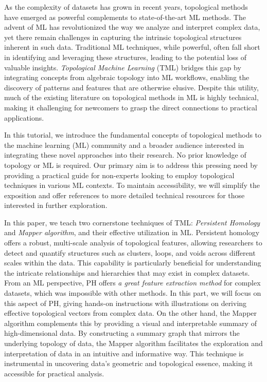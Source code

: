 


As the complexity of datasets has grown in recent years, topological methods have emerged as powerful complements to state-of-the-art ML methods. The advent of ML has revolutionized the way we analyze and interpret complex data, yet there remain challenges in capturing the intrinsic topological structures inherent in such data. Traditional ML techniques, while powerful, often fall short in identifying and leveraging these structures, leading to the potential loss of valuable insights. \textit{Topological Machine Learning} (TML) bridges this gap by integrating concepts from algebraic topology into ML workflows, enabling the discovery of patterns and features that are otherwise elusive. Despite this utility, much of the existing literature on topological methods in ML is highly technical, making it challenging for newcomers to grasp the direct connections to practical applications. 

In this tutorial, we introduce the fundamental concepts of topological methods to the machine learning (ML) community and a broader audience interested in integrating these novel approaches into their research. No prior knowledge of topology or ML is required. Our primary aim is to address this pressing need by providing a practical guide for non-experts looking to employ topological techniques in various ML contexts. To maintain accessibility, we will simplify the exposition and offer references to more detailed technical resources for those interested in further exploration.

In this paper, we teach two cornerstone techniques of TML: \textit{Persistent Homology} and \textit{Mapper algorithm}, and their effective utilization in ML. Persistent homology offers a robust, multi-scale analysis of topological features, allowing researchers to detect and quantify structures such as clusters, loops, and voids across different scales within the data. This capability is particularly beneficial for understanding the intricate relationships and hierarchies that may exist in complex datasets. From an ML perspective, PH offers \textit{a great feature extraction method} for complex datasets, which was impossible with other methods. In this part, we will focus on this aspect of PH, giving hands-on instructions with illustrations on deriving effective topological vectors from complex data. On the other hand, the Mapper algorithm complements this by providing a visual and interpretable summary of high-dimensional data. By constructing a summary graph that mirrors the underlying topology of data, the Mapper algorithm facilitates the exploration and interpretation of data in an intuitive and informative way. This technique is instrumental in uncovering data's geometric and topological essence, making it accessible for practical analysis. 


